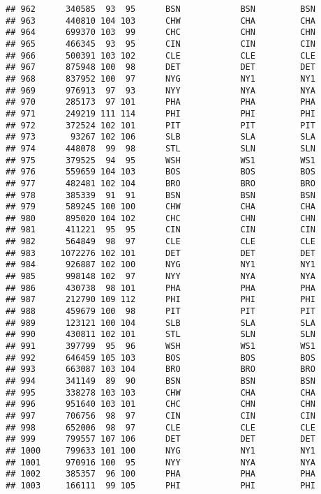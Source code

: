 \documentclass[]{article}
\begin{document}
\begin{verbatim}
## 962      340585  93  95      BSN            BSN         BSN
## 963      440810 104 103      CHW            CHA         CHA
## 964      699370 103  99      CHC            CHN         CHN
## 965      466345  93  95      CIN            CIN         CIN
## 966      500391 103 102      CLE            CLE         CLE
## 967      875948 100  98      DET            DET         DET
## 968      837952 100  97      NYG            NY1         NY1
## 969      976913  97  93      NYY            NYA         NYA
## 970      285173  97 101      PHA            PHA         PHA
## 971      249219 111 114      PHI            PHI         PHI
## 972      372524 102 101      PIT            PIT         PIT
## 973       93267 102 106      SLB            SLA         SLA
## 974      448078  99  98      STL            SLN         SLN
## 975      379525  94  95      WSH            WS1         WS1
## 976      559659 104 103      BOS            BOS         BOS
## 977      482481 102 104      BRO            BRO         BRO
## 978      385339  91  91      BSN            BSN         BSN
## 979      589245 100 100      CHW            CHA         CHA
## 980      895020 104 102      CHC            CHN         CHN
## 981      411221  95  95      CIN            CIN         CIN
## 982      564849  98  97      CLE            CLE         CLE
## 983     1072276 102 101      DET            DET         DET
## 984      926887 102 100      NYG            NY1         NY1
## 985      998148 102  97      NYY            NYA         NYA
## 986      430738  98 101      PHA            PHA         PHA
## 987      212790 109 112      PHI            PHI         PHI
## 988      459679 100  98      PIT            PIT         PIT
## 989      123121 100 104      SLB            SLA         SLA
## 990      430811 102 101      STL            SLN         SLN
## 991      397799  95  96      WSH            WS1         WS1
## 992      646459 105 103      BOS            BOS         BOS
## 993      663087 103 104      BRO            BRO         BRO
## 994      341149  89  90      BSN            BSN         BSN
## 995      338278 103 103      CHW            CHA         CHA
## 996      951640 103 101      CHC            CHN         CHN
## 997      706756  98  97      CIN            CIN         CIN
## 998      652006  98  97      CLE            CLE         CLE
## 999      799557 107 106      DET            DET         DET
## 1000     799633 101 100      NYG            NY1         NY1
## 1001     970916 100  95      NYY            NYA         NYA
## 1002     385357  96 100      PHA            PHA         PHA
## 1003     166111  99 105      PHI            PHI         PHI

\end{verbatim}
\end{document}

